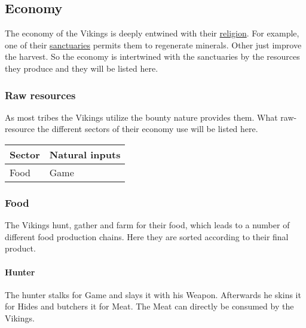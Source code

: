\subsection{Economy}\label{ch:Tribes:Vikings:Economy}
The economy of the \gls*{Vikings} is deeply entwined with their
\hyperref[ch:Tribes:Vikings:Religion]{religion}. For example, one of their
\hyperref[ch:Tribes:Vikings:Religion:Mountain]{sanctuaries} permits them to
regenerate minerals. Other just improve the harvest. So the economy is
intertwined with the sanctuaries by the resources they produce and they will be
listed here.

\subsubsection{Raw resources}\label{ch:Tribes:Vikings:Ecnonmy:RawInputs}
As most tribes the \gls*{Vikings} utilize the bounty nature provides them. What
raw-resource the different sectors of their economy use will be listed here.

\begin{longtable}{ll}
	\toprule
	Sector & Natural inputs \\
	\midrule
	Food   & \Gls{Game}     \\
	\bottomrule
\end{longtable}

\subsubsection{Food}
The \gls*{Vikings} hunt, gather and farm for their food, which leads to a
number of different food production chains. Here they are sorted according to
their final product.

\paragraph{Hunter}
The hunter stalks for \gls{Game} and slays it with his \gls{Weapon}. Afterwards
he skins it for \glspl{Hide} and butchers it for \gls{Meat}. The \gls{Meat} can
directly be consumed by the \gls{Vikings}.
